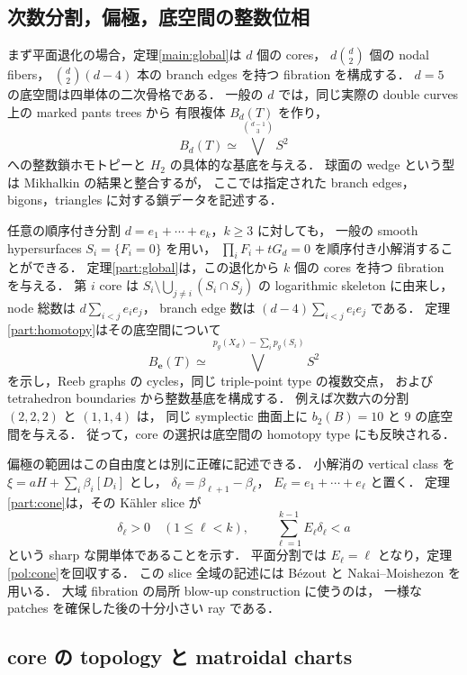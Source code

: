 \subsection{次数分割，偏極，底空間の整数位相}

まず平面退化の場合，定理\ref{main:global}は $d$ 個の cores，
$d\binom d2$ 個の nodal fibers，
$\binom d2(d-4)$ 本の branch edges を持つ fibration を構成する．
$d=5$ の底空間は四単体の二次骨格である．
一般の $d$ では，同じ実際の double curves 上の marked pants trees から
有限複体 $B_d(T)$ を作り，
\[
 B_d(T)\simeq\bigvee^{\binom{d-1}{3}}S^2
\]
への整数鎖ホモトピーと $H_2$ の具体的な基底を与える．
球面の wedge という型は Mikhalkin の結果と整合するが，
ここでは指定された branch edges，bigons，triangles に対する鎖データを記述する．

任意の順序付き分割 $d=e_1+\cdots+e_k$，$k\geq3$ に対しても，
一般の smooth hypersurfaces $S_i=\{F_i=0\}$ を用い，
$\prod_iF_i+tG_d=0$ を順序付き小解消することができる．
定理\ref{part:global}は，この退化から $k$ 個の cores を持つ fibration を与える．
第 $i$ core は
$S_i\setminus\bigcup_{j\ne i}(S_i\cap S_j)$ の logarithmic skeleton に由来し，
node 総数は $d\sum_{i<j}e_i e_j$，
branch edge 数は $(d-4)\sum_{i<j}e_i e_j$ である．
定理\ref{part:homotopy}はその底空間について
\[
 B_{\mathbf e}(T)\simeq
 \bigvee^{\,p_g(X_d)-\sum_i p_g(S_i)}S^2
\]
を示し，Reeb graphs の cycles，同じ triple-point type の複数交点，
および tetrahedron boundaries から整数基底を構成する．
例えば次数六の分割 $(2,2,2)$ と $(1,1,4)$ は，
同じ symplectic 曲面上に $b_2(B)=10$ と $9$ の底空間を与える．
従って，core の選択は底空間の homotopy type にも反映される．

偏極の範囲はこの自由度とは別に正確に記述できる．
小解消の vertical class を
$\xi=aH+\sum_i\beta_i[D_i]$ とし，
$\delta_\ell=\beta_{\ell+1}-\beta_\ell$，
$E_\ell=e_1+\cdots+e_\ell$ と置く．
定理\ref{part:cone}は，その Kähler slice が
\[
 \delta_\ell>0\quad(1\leq\ell<k),\qquad
 \sum_{\ell=1}^{k-1}E_\ell\delta_\ell<a
\]
という sharp な開単体であることを示す．
平面分割では $E_\ell=\ell$ となり，定理\ref{pol:cone}を回収する．
この slice 全域の記述には Bézout と Nakai--Moishezon を用いる．
大域 fibration の局所 blow-up construction に使うのは，
一様な patches を確保した後の十分小さい ray である．

\subsection{core の topology と matroidal charts}

